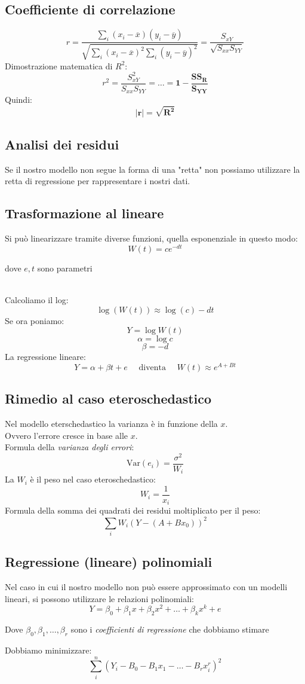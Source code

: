 \documentclass[]{article}
\begin{document}
    \subsection{Coefficiente di correlazione}
    \[ r = \frac{\sum_i (x_i - \overline x)(y_i - \overline y)}{\sqrt{\sum_i (x_i - \overline x)^2 \sum_i(y_i - \overline y)^2}} = \frac{S_{xY}}{\sqrt{S_{xx}S_{YY}}} \]
    Dimostrazione matematica di $R^2$:
    \[ r^2 = \frac{S_{xY}^2}{S_{xx}S_{YY}} = \ldots = \boldsymbol{1- \frac{SS_R}{S_{YY}}} \]
    Quindi:
    \[ \boldsymbol{|r| = \sqrt{R^2}} \]
    \subsection{Analisi dei residui}
    Se il nostro modello non segue la forma di una "retta" non possiamo utilizzare la retta di regressione per rappresentare i nostri dati.
    \subsection{Trasformazione al lineare}
    Si può linearizzare tramite diverse funzioni, quella esponenziale in questo modo:
    \[ W(t) = ce^{-dt}\]
    \centerline{dove $e, t$ sono parametri} \\[2ex]
    Calcoliamo il log:
    \[ \log({W}(t)) \approx \log{(c)}-dt \]
    Se ora poniamo:
    \[ Y = \log{W(t)} \]
    \[ \alpha = \log{c} \]
    \[ \beta = -d \]
    La regressione lineare:
    \[ Y = \alpha + \beta t + e \quad \text{ diventa } \quad W(t) \approx e^{A+Bt} \]
    \subsection{Rimedio al caso eteroschedastico}
    Nel modello eterschedastico la varianza è in funzione della $x$. \\
    Ovvero l'errore cresce in base alle $x$. \\[2ex]
    Formula della \textit{varianza degli errori}:
    \[ \text{Var}(e_i)=\frac{\sigma^2}{W_i} \]
    La $W_i$ è il peso nel caso eteroschedastico:
    \[ W_i=\frac{1}{x_i} \]
    Formula della somma dei quadrati dei residui moltiplicato per il peso:
    \[ \sum_iW_i(Y-(A+Bx_0))^2 \]
    \subsection{Regressione (lineare) polinomiali}
    Nel caso in cui il nostro modello non può essere approssimato con un modelli lineari, si possono utilizzare le relazioni polinomiali:
    \[ Y = \beta_0 + \beta_1x+\beta_2x^2 +\ldots+\beta_kx^k + e \]
    \centerline{Dove $\beta_0, \beta_1, \ldots, \beta_r$ sono i \textit{coefficienti di regressione} che dobbiamo stimare}
    Dobbiamo minimizzare:
    \[ \sum_i^n (Y_i-B_0-B_1x_1-\ldots-B_rx_i^r)^2 \]
\end{document}

